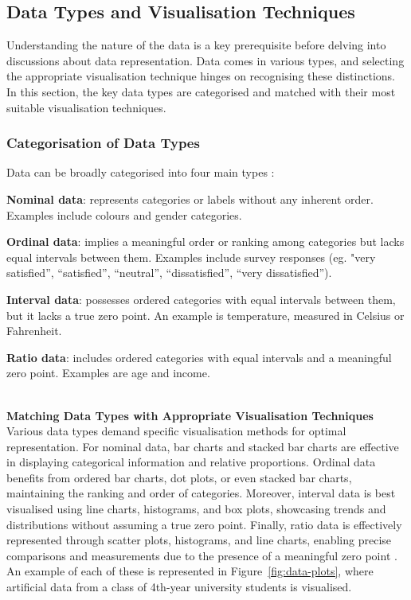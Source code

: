 \documentclass{article}\usepackage[]{graphicx}\usepackage[]{xcolor}
\numberwithin{equation}{section}
\begin{document}
\subsection{Data Types and Visualisation Techniques}
Understanding the nature of the data is a key prerequisite before delving into discussions about data representation. Data comes in various types, and selecting the appropriate visualisation technique hinges on recognising these distinctions. In this section, the key data types are categorised and matched with their most suitable visualisation techniques.

\subsubsection{Categorisation of Data Types}
Data can be broadly categorised into four main types \cite{wilkinson2012grammar}: 
\begin{itemise}
    \item \textbf{Nominal data}: represents categories or labels without any inherent order. Examples include colours and gender categories.
    \item \textbf{Ordinal data}: implies a meaningful order or ranking among categories but lacks equal intervals between them. Examples include survey responses (eg. "very satisfied”, “satisfied”, “neutral”, “dissatisfied”, “very dissatisfied”).
    \item \textbf{Interval data}: possesses ordered categories with equal intervals between them, but it lacks a true zero point. An example is temperature, measured in Celsius or Fahrenheit.
    \item \textbf{Ratio data}: includes ordered categories with equal intervals and a meaningful zero point. Examples are age and income.
\end{itemise}
\\

\noindent \textbf{Matching Data Types with Appropriate Visualisation Techniques}\\
\noindent Various data types demand specific visualisation methods for optimal representation. For nominal data, bar charts and stacked bar charts are effective in displaying categorical information and relative proportions. Ordinal data benefits from ordered bar charts, dot plots, or even stacked bar charts, maintaining the ranking and order of categories. Moreover, interval data is best visualised using line charts, histograms, and box plots, showcasing trends and distributions without assuming a true zero point. Finally, ratio data is effectively represented through scatter plots, histograms, and line charts, enabling precise comparisons and measurements due to the presence of a meaningful zero point \cite{healy2018data}. An example of each of these is represented in Figure~\ref{fig:data-plots}, where artificial data from a class of 4th-year university students is visualised.
\end{document}
